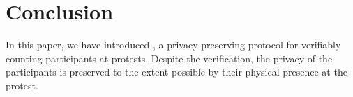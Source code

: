 \section{Conclusion}%
\label{Conclusion}

In this paper, we have introduced \CROCUS, a privacy-preserving protocol for verifiably counting participants at protests. 
Despite the verification, the privacy of the participants is preserved to the extent possible by their physical presence at the protest. 


